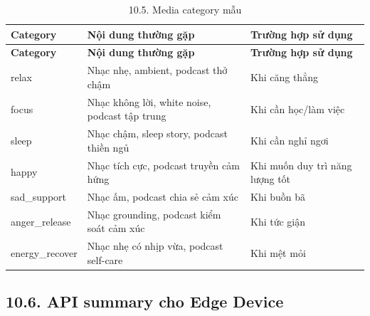 \documentclass[12pt,a4paper]{article}
\begin{document}
\begin{center}
\begin{longtable}{|P{0.25\textwidth}|P{0.32\textwidth}|P{0.33\textwidth}|}
\caption{10.5. Media category mẫu}\\
\hline
\textbf{Category} & \textbf{Nội dung thường gặp} & \textbf{Trường hợp sử dụng} \\
\hline
\endfirsthead
\hline
\textbf{Category} & \textbf{Nội dung thường gặp} & \textbf{Trường hợp sử dụng} \\
\hline
\endhead
relax & Nhạc nhẹ, ambient, podcast thở chậm & Khi căng thẳng \\
\hline
focus & Nhạc không lời, white noise, podcast tập trung & Khi cần học/làm việc \\
\hline
sleep & Nhạc chậm, sleep story, podcast thiền ngủ & Khi cần nghỉ ngơi \\
\hline
happy & Nhạc tích cực, podcast truyền cảm hứng & Khi muốn duy trì năng lượng tốt \\
\hline
sad\_support & Nhạc ấm, podcast chia sẻ cảm xúc & Khi buồn bã \\
\hline
anger\_release & Nhạc grounding, podcast kiểm soát cảm xúc & Khi tức giận \\
\hline
energy\_recover & Nhạc nhẹ có nhịp vừa, podcast self-care & Khi mệt mỏi \\
\hline
\end{longtable}
\end{center}

\subsection*{10.6. API summary cho Edge Device}
\end{document}

